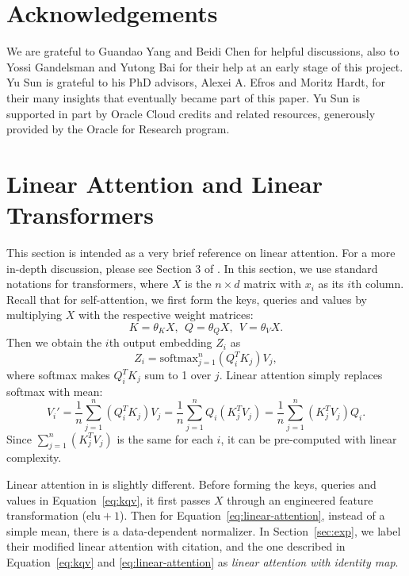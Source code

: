 \documentclass{article}
\begin{document}
\section*{Acknowledgements}
We are grateful to Guandao Yang and Beidi Chen for helpful discussions, also to Yossi Gandelsman and Yutong Bai for their help at an early stage of this project.
Yu Sun is grateful to his PhD advisors, Alexei A. Efros and Moritz Hardt, for their many insights that eventually became part of this paper.
Yu Sun is supported in part by Oracle Cloud credits and related resources, generously provided by the Oracle for Research program. 




\appendix

\clearpage

\section{Linear Attention and Linear Transformers}
\label{app:linear-attention}
This section is intended as a very brief reference on linear attention. 
For a more in-depth discussion, please see Section 3 of \cite{katharopoulos2020transformers}.
In this section, we use standard notations for transformers, where $X$ is the $n\times d$ matrix with $x_i$ as its $i$th column.
Recall that for self-attention, we first form the keys, queries and values by multiplying $X$ with the respective weight matrices:
\begin{equation}
\label{eq:kqv}
K = \theta_K X, ~~Q = \theta_Q X, ~~V = \theta_V X.
\end{equation}
Then we obtain the $i$th output embedding $Z_i$ as
\begin{equation}
Z_i = \text{softmax}_{j=1}^n \left( Q_i^T K_j \right) V_j,
\end{equation}
where softmax makes $Q_i^T K_j$ sum to 1 over $j$.
Linear attention simply replaces softmax with mean:
\begin{equation}
\label{eq:linear-attention}
V_i' 
= \frac{1}{n}\sum_{j=1}^n \left( Q_i^T K_j \right) V_j
= \frac{1}{n}\sum_{j=1}^n Q_i \left( K_j^T V_j \right)
= \frac{1}{n}\sum_{j=1}^n \left( K_j^T V_j \right) Q_i.
\end{equation}
Since $\sum_{j=1}^n \left( K_j^T V_j \right)$ is the same for each $i$, it can be pre-computed with linear complexity.

Linear attention in \cite{katharopoulos2020transformers} is slightly different. Before forming the keys, queries and values in Equation~\ref{eq:kqv}, it first passes $X$ through an engineered feature transformation ($\text{elu}+1$).
Then for Equation~\ref{eq:linear-attention}, instead of a simple mean, there is a data-dependent normalizer.
In Section~\ref{sec:exp},
we label their modified linear attention with citation, and the one described in Equation~\ref{eq:kqv} and \ref{eq:linear-attention} as \textit{linear attention with identity map}.
\end{document}
